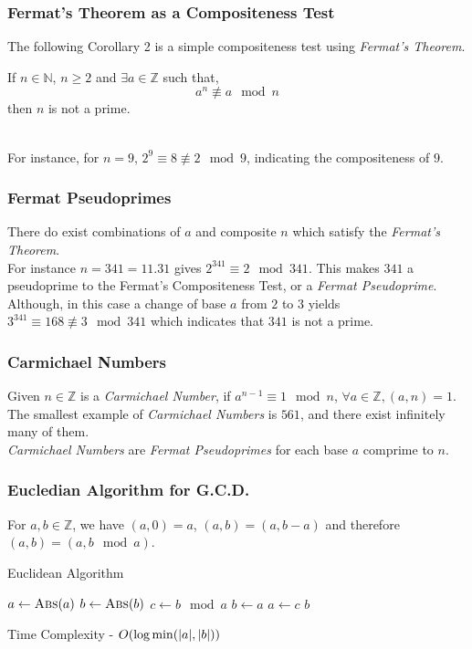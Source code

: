 \documentclass{beamer}
\DeclarePairedDelimiter\abs{\lvert}{\rvert}
\begin{document}
\begin{frame}
\frametitle{Fermat's Theorem as a Compositeness Test}
The following Corollary 2 is a simple compositeness test using \emph{Fermat's Theorem}. 
\\[3mm]
\begin{corollary}[2]
\label{corollary:FermatLittleTheoremConverse}
If $n \in \mathbb{N}$, $n \geq 2$ and $\exists a \in \mathbb{Z}$ such that,
\[a^n \not\equiv a \mod n\]
then $n$ is not a prime.  
\end{corollary}
\ \\[3mm]
For instance, for $n = 9$, $2^9 \equiv 8 \not\equiv 2 \mod 9$, indicating the compositeness of $9$.

\end{frame}

\begin{frame}
\frametitle{Fermat Pseudoprimes}

There do exist combinations of $a$ and composite $n$ which satisfy the \emph{Fermat's Theorem}. 
\\[3mm]
For instance $n = 341 = 11.31$ gives $2^{341} \equiv 2 \mod 341$. This makes $341$ a pseudoprime to the Fermat's Compositeness Test, or a \emph{Fermat Pseudoprime}. 
\\[3mm]
Although, in this case a change of base $a$ from $2$ to $3$ yields $3^{341} \equiv 168 \not\equiv 3 \mod 341$ which indicates that $341$ is not a prime.

\end{frame}

\begin{frame}
\frametitle{Carmichael Numbers}

Given $n \in \mathbb{Z}$ is a \emph{Carmichael Number}, if $a^{n-1} \equiv 1 \mod n$, $\forall a \in \mathbb{Z}, (a,n) = 1$. 
\\[3mm]
The smallest example of \emph{Carmichael Numbers} is $561$, and there exist infinitely many of them.
\\[3mm]
\emph{Carmichael Numbers} are \emph{Fermat Pseudoprimes} for each base $a$ comprime to $n$.

\end{frame}

\begin{frame}
\frametitle{Eucledian Algorithm for G.C.D.}

For $a, b \in \mathbb{Z}$, we have $(a,0) = a$, $(a,b) = (a,b-a)$ and therefore $(a,b) = (a,b \mod a)$. 
\\[3mm]
\begin{algorithm}[H]
\caption{Euclidean Algorithm}
\label{alg:EuclideanAlgorithm}
\begin{algorithmic}
\State $a \gets \Call{Abs}{a}$
\State $b \gets \Call{Abs}{b}$ 
	\State {} 
\EndIf
{}
	\State $c \gets b \mod a$
	\State $b \gets a$
	\State $a \gets c$
\EndWhile
\State \Return $b$
\EndProcedure
\end{algorithmic}
\end{algorithm}

Time Complexity - $O(\log \min(\abs a,\abs b))$
\end{frame}
\end{document}
